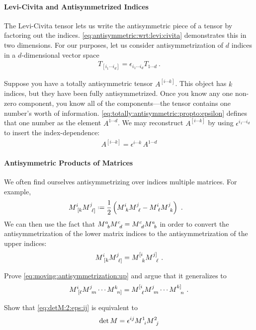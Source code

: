 \paragraph{Levi-Civita and Antisymmetrized Indices}
The Levi-Civita tensor lets us write the antisymmetric piece of a tensor by factoring out the indices. \eqref{eq:antisymmetric:wrt:levi:civita} demonstrates this in two dimensions. For our purposes, let us consider antisymmetrization of $d$ indices in a $d$-dimensional vector space
\begin{align}
    T_{[i_1\cdots i_d]} = 
    \epsilon_{i_1\cdots i_d}
    T_{1\cdots d} \ .
    \label{eq:totally:antisymmetric:propto:epsilon}
\end{align}
\begin{example}\label{eg:pull:out:epsilon}
Suppose you have a totally antisymmetric tensor $A^{[i\cdots k]}$. This object has $k$ indices, but they have been fully antisymmetrized. Once you know any one non-zero component, you know all of the components---the tensor contains one number's worth of information. \eqref{eq:totally:antisymmetric:propto:epsilon} defines that one number as the element $A^{1\cdots d}$. We may reconstruct $A^{[i\cdots k]}$ by using $\epsilon^{i_1\cdots i_d}$ to insert the index-dependence:
\begin{align}
    A^{[i\cdots k]} = \epsilon^{i\cdots k} \, A^{1\cdots d}
\end{align}
\end{example}

\paragraph{Antisymmetric Products of Matrices}
We often find ourselves antisymmetrizing over indices multiple matrices. For example,
\begin{align}
    M\aij{i}{[k}M\aij{j}{\ell]} &\defeq
    \frac{1}{2}
    \left(M\aij{i}{k}M\aij{j}{\ell} - M\aij{i}{\ell}M\aij{j}{k} \right) \ .
\end{align}
We can then use the fact that $M\aij{a}{b}M\aij{c}{d} = M\aij{c}{d} M\aij{a}{b}$ in order to convert the antisymmetrization of the lower matrix indices to the antisymmetrization of the upper indices:
\begin{align}
    M\aij{i}{[k}M\aij{j}{\ell]}
    = 
    M\aij{[i}{k}M\aij{j]}{\ell} \ .
    \label{eq:moving:antisymmetrization:up}
\end{align}
\begin{exercise}
Prove \eqref{eq:moving:antisymmetrization:up} and argue that it generalizes to
\begin{align}
   M\aij{i}{[\ell} M\aij{j}{m} \cdots M\aij{k}{n]} 
   =
   M\aij{[i}{\ell} M\aij{j}{m} \cdots M\aij{k]}{n} \ .
   \label{eq:antisymmetrize:goes:up}
\end{align}
\end{exercise}
\begin{exercise}
Show that \eqref{eq:detM:2:eps:ij} is equivalent to 
\begin{align}
    \det M = \epsilon^{ij} M\aij{1}{i}M\aij{2}{j}
\end{align}

\end{exercise}


